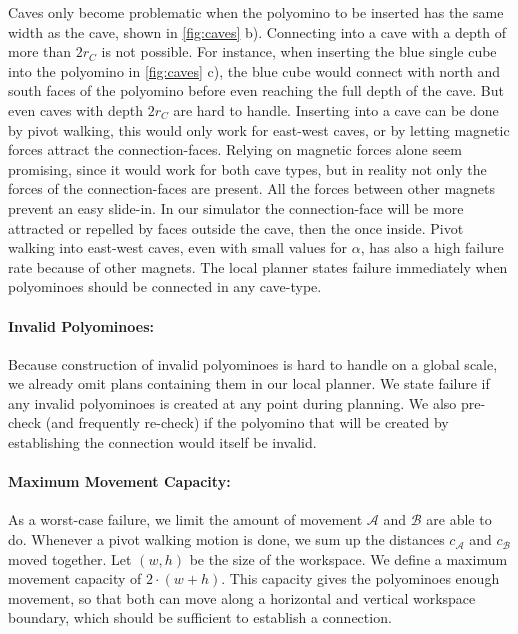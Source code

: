 Caves only become problematic when the polyomino to be inserted has the same width as the cave, shown in \autoref{fig:caves} b).
Connecting into a cave with a depth of more than $2 r_C$ is not possible.
For instance, when inserting the blue single cube into the polyomino in \autoref{fig:caves} c), the blue cube would connect with north and south faces of the polyomino before even reaching the full depth of the cave.
But even caves with depth $2 r_C$ are hard to handle.
Inserting into a cave can be done by pivot walking, this would only work for east-west caves, or by letting magnetic forces attract the connection-faces.
Relying on magnetic forces alone seem promising, since it would work for both cave types, but in reality not only the forces of the connection-faces are present.
All the forces between other magnets prevent an easy slide-in.
In our simulator the connection-face will be more attracted or repelled by faces outside the cave, then the once inside.
Pivot walking into east-west caves, even with small values for $\alpha$, has also a high failure rate because of other magnets.
The local planner states failure immediately when polyominoes should be connected in any cave-type.

\paragraph{Invalid Polyominoes:}

Because construction of invalid polyominoes is hard to handle on a global scale, we already omit plans containing them in our local planner.
We state failure if any invalid polyominoes is created at any point during planning.
We also pre-check (and frequently re-check) if the polyomino that will be created by establishing the connection would itself be invalid. 

\paragraph{Maximum Movement Capacity:}

As a worst-case failure, we limit the amount of movement $\mathcal{A}$ and $\mathcal{B}$ are able to do.
Whenever a pivot walking motion is done, we sum up the distances $c_\mathcal{A}$ and $c_\mathcal{B}$ moved together.
Let $(w,h)$ be the size of the workspace.
We define a maximum movement capacity of $2\cdot(w+h)$.
This capacity gives the polyominoes enough movement, so that both can move along a horizontal and vertical workspace boundary, which should be sufficient to establish a connection.

